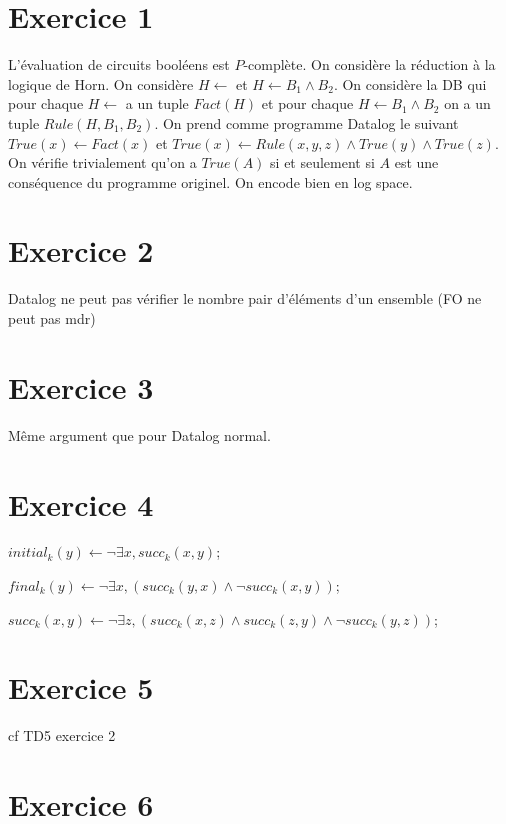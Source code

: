 \documentclass{cours}
\begin{document}
\section{Exercice 1}
L'évaluation de circuits booléens est $P$-complète. On considère la réduction à la logique de Horn.  
On considère $H \gets$ et $H\gets B_{1} \land B_{2}$. 
On considère la DB qui pour chaque $H\gets$ a un tuple $Fact(H)$ et pour chaque $H \gets B_{1} \land B_{2}$ on a un tuple $Rule(H, B_{1}, B_{2})$. 
On prend comme programme Datalog le suivant $True(x) \gets Fact(x)$ et $True(x) \gets Rule(x, y, z) \land True(y) \land True(z)$. On vérifie trivialement qu'on a $True(A)$ si et seulement si $A$ est une conséquence du programme originel. 
On encode bien en log space. 

\section{Exercice 2}
Datalog ne peut pas vérifier le nombre pair d'éléments d'un ensemble (FO ne peut pas mdr)

\section{Exercice 3}
Même argument que pour Datalog normal. 

\section{Exercice 4}
$initial_{k}(y) \gets \lnot \exists x, succ_{k}(x, y)$;

$final_{k}(y) \gets \lnot \exists x, (succ_{k}(y, x) \land \lnot succ_{k}(x, y))$;

$succ_{k}(x, y) \gets \lnot \exists z, (succ_{k}(x, z) \land succ_{k}(z, y) \land \lnot succ_{k}(y, z))$;

\section{Exercice 5}
cf TD5 exercice 2

\section{Exercice 6}
\end{document}

